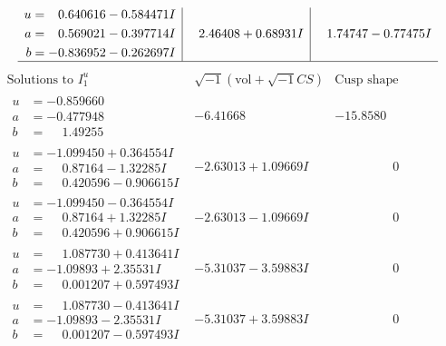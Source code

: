\documentclass[1p]{elsarticle_modified}
\theoremstyle{definition}
\newcommand{\I}{\sqrt{-1}}
\begin{document}
$$\begin{array}{c|c|c}
\begin{aligned}
u &= \phantom{-}0.640616 - 0.584471 I \\
a &= \phantom{-}0.569021 - 0.397714 I \\
b &= -0.836952 - 0.262697 I\end{aligned}
 & \phantom{-}2.46408 + 0.68931 I & \phantom{-}1.74747 - 0.77475 I\\
 \hline 
 \end{array}$$\newpage$$\begin{array}{c|c|c}  
\text{Solutions to }I^u_{1}& \I (\text{vol} + \sqrt{-1}CS) & \text{Cusp shape}\\
 \hline 
\begin{aligned}
u &= -0.859660\phantom{ +0.000000I} \\
a &= -0.477948\phantom{ +0.000000I} \\
b &= \phantom{-}1.49255\phantom{ +0.000000I}\end{aligned}
 & -6.41668\phantom{ +0.000000I} & -15.8580\phantom{ +0.000000I} \\ \hline\begin{aligned}
u &= -1.099450 + 0.364554 I \\
a &= \phantom{-}0.87164 - 1.32285 I \\
b &= \phantom{-}0.420596 - 0.906615 I\end{aligned}
 & -2.63013 + 1.09669 I & \phantom{-0.000000 } 0 \\ \hline\begin{aligned}
u &= -1.099450 - 0.364554 I \\
a &= \phantom{-}0.87164 + 1.32285 I \\
b &= \phantom{-}0.420596 + 0.906615 I\end{aligned}
 & -2.63013 - 1.09669 I & \phantom{-0.000000 } 0 \\ \hline\begin{aligned}
u &= \phantom{-}1.087730 + 0.413641 I \\
a &= -1.09893 + 2.35531 I \\
b &= \phantom{-}0.001207 + 0.597493 I\end{aligned}
 & -5.31037 - 3.59883 I & \phantom{-0.000000 } 0 \\ \hline\begin{aligned}
u &= \phantom{-}1.087730 - 0.413641 I \\
a &= -1.09893 - 2.35531 I \\
b &= \phantom{-}0.001207 - 0.597493 I\end{aligned}
 & -5.31037 + 3.59883 I & \phantom{-0.000000 } 0 \\ \hline\begin{aligned}

\end{aligned}
\end{array}$$
\end{document}
